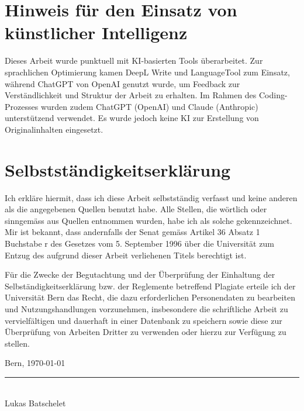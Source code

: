 \documentclass{template}
\begin{document}
\clearpage
{}
\printbibliography[heading=bibintoc, title=Literaturverzeichnis]

\clearpage

\section*{Hinweis für den Einsatz von künstlicher Intelligenz}

Dieses Arbeit wurde punktuell mit KI-basierten Tools überarbeitet. Zur sprachlichen Optimierung kamen DeepL Write und LanguageTool zum Einsatz, während ChatGPT von OpenAI genutzt wurde, um Feedback zur Verständlichkeit und Struktur der Arbeit zu erhalten. Im Rahmen des Coding-Prozesses wurden zudem ChatGPT (OpenAI) und Claude (Anthropic) unterstützend verwendet. Es wurde jedoch keine KI zur Erstellung von Originalinhalten eingesetzt.


\clearpage

\section*{Selbstständigkeitserklärung}

Ich erkläre hiermit, dass ich diese Arbeit selbstständig verfasst und keine anderen als die angegebenen Quellen benutzt habe. Alle Stellen, die wörtlich oder sinngemäss aus Quellen entnommen wurden, habe ich als solche gekennzeichnet. Mir ist bekannt, dass andernfalls der Senat gemäss Artikel 36 Absatz 1 Buchstabe r des Gesetzes vom 5. September 1996 über die Universität zum Entzug des aufgrund dieser Arbeit verliehenen Titels berechtigt ist.

Für die Zwecke der Begutachtung und der Überprüfung der Einhaltung der Selbständigkeitserklärung bzw. der Reglemente betreffend Plagiate erteile ich der Universität Bern das Recht, die dazu erforderlichen Personendaten zu bearbeiten und Nutzungshandlungen vorzunehmen, insbesondere die schriftliche Arbeit zu vervielfältigen und dauerhaft in einer Datenbank zu speichern sowie diese zur Überprüfung von Arbeiten Dritter zu verwenden oder hierzu zur Verfügung zu stellen.

\vspace{8cm}

\noindent Bern, \today

\vspace{2cm}

\noindent\rule{6cm}{0.4pt} \\
\noindent Lukas Batschelet




\clearpage
{}
   
   
\end{document}
